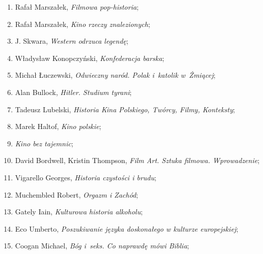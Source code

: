 \documentclass[a4paper,11pt]{article}
\begin{document}
\begin{enumerate}
\item Rafał Marszałek, \textit{Filmowa pop-historia};



\item Rafał Marszałek, \textit{Kino rzeczy znalezionych};



\item J. Skwara, \textit{Western odrzuca legendę};



\item Władysław Konopczyński, \textit{Konfederacja barska};



\item Michał Łuczewski, \textit{Odwieczny naród. Polak i~katolik
    w~Żmiącej};



\item Alan Bullock, \textit{Hitler. Studium tyrani};



\item Tadeusz Lubelski, \textit{Historia Kina Polskiego, Twórcy, Filmy,
    Konteksty};



\item Marek Haltof, \textit{Kino polskie};



\item \textit{Kino bez tajemnic};



\item David Bordwell, Kristin Thompson, \textit{Film Art. Sztuka
    filmowa. Wprowadzenie};



\item Vigarello Georges, \textit{Historia czystości i brudu};



\item Muchembled Robert, \textit{Orgazm i Zachód};



\item Gately Iain, \textit{Kulturowa historia alkoholu};



\item Eco Umberto, \textit{Poszukiwanie języka doskonałego w kulturze
    europejskiej};



\item Coogan Michael, \textit{Bóg i~seks. Co naprawdę mówi Biblia};




\end{enumerate}
\end{document}
